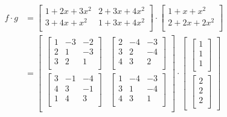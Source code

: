 \begin{align*}
  f \cdot g & = {
  \begin{bmatrix}
    1+2x+3x^2 & 2+3x+4x^2 \\
    3+4x+x^2  & 1+3x+4x^2 \\
  \end{bmatrix}
  \cdot
  \begin{bmatrix}
    1+x+x^2   \\
    2+2x+2x^2 \\
  \end{bmatrix}
  }               \\
            & = {
  \begin{bmatrix}
    \begin{bmatrix}
      1 & -3 & -2 \\
      2 & 1  & -3 \\
      3 & 2  & 1  \\
    \end{bmatrix} & 
    \begin{bmatrix}
      2 & -4 & -3 \\
      3 & 2  & -4 \\
      4 & 3  & 2  \\
    \end{bmatrix}   \\
    \begin{bmatrix}
      3 & -1 & -4 \\
      4 & 3  & -1 \\
      1 & 4  & 3  \\
    \end{bmatrix} & 
    \begin{bmatrix}
      1 & -4 & -3 \\
      3 & 1  & -4 \\
      4 & 3  & 1  \\
    \end{bmatrix}   \\
  \end{bmatrix}
  \cdot
  \begin{bmatrix}
    \begin{bmatrix}
      1 \\
      1 \\
      1 \\
    \end{bmatrix} \\
    \begin{bmatrix}
      2 \\
      2 \\
      2 \\

\end{bmatrix}
\end{bmatrix}}
\end{align*}
